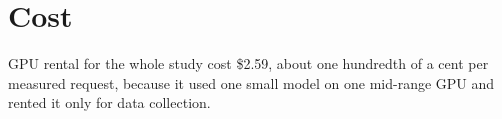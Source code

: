 \section{Cost}
\label{sec:cost}

GPU rental for the whole study cost \$2.59, about one hundredth of a cent per measured
request, because it used one small model on one mid-range GPU and rented it only for
data collection.
